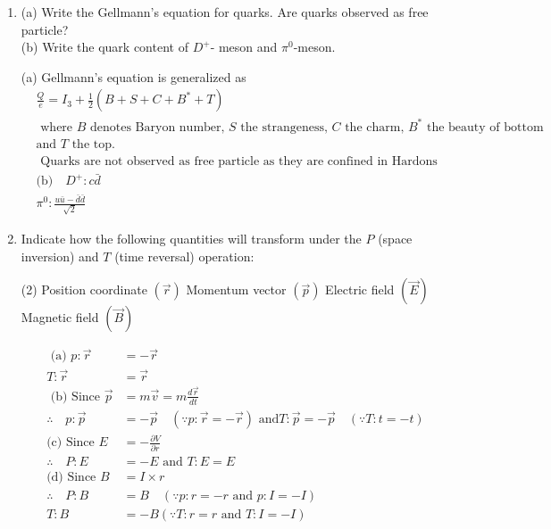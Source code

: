 \begin{enumerate}
\begin{tasks}
		\task[\textbf{d.}] $\Lambda \rightarrow \pi^{+}+e^{-}+\bar{v}_e$
	\end{tasks}
	\begin{answer}
(a) Forbidden because Lepton number is not conserved\\
	(b) Forbidden because charge is not conserved\\
	(c) Allowed\\
	(d) Allowed
\end{answer}
	\item (a) Write the Gellmann's equation for quarks. Are quarks observed as free particle?\\
	(b) Write the quark content of $D^{+}$- meson and $\pi^0$-meson.
		\begin{answer}
				(a) Gellmann's equation is generalized as
		\begin{align*}
		&\frac{Q}{e}=I_3+\frac{1}{2}\left(B+S+C+B^*+T\right)\\
	&\text{	where $B$ denotes Baryon number, $S$ the strangeness, $C$ the charm, $B^*$ the beauty of bottom }\\
	&\text{and $T$ the top.}\\
	&\text{	Quarks are not observed as free particle as they are confined in Hardons}\\
	&\text{(b)}\quad  D^{+}: c \bar{d}\\
	&\pi^0: \frac{u \bar{u}-\bar{d} \bar{d}}{\sqrt{2}}
		\end{align*}
	\end{answer}
	\item Indicate how the following quantities will transform under the $P$ (space inversion) and $T$ (time reversal) operation:
	 \begin{tasks}(2)
		\task[\textbf{a.}] Position coordinate $(\vec{r})$
		\task[\textbf{b.}] Momentum vector $(\vec{p})$
		\task[\textbf{c.}] Electric field $(\vec{E})$
		\task[\textbf{d.}] Magnetic field $(\vec{B})$
	\end{tasks}
		\begin{answer}
		\begin{align*}
		\text { (a) } p: \vec{r}&=-\vec{r}\\
		T: \vec{r}&=\vec{r}\\
	\text{	(b) Since }\vec{p}&=m \vec{v}=m \frac{d \vec{r}}{d t}\\
		\therefore \quad  p: \vec{p}&=-\vec{p} \quad(\because p: \vec{r}=-\vec{r})\text{ and} T: \vec{p}=-\vec{p} \quad(\because T: t=-t)\\
		\text{(c) Since }E&=-\frac{\partial V}{\partial r}\\
		\therefore \quad P: E&=-E \text{ and }T: E=E\\
		\text{(d) Since }B&=I \times r\\
		\therefore\quad  P: B&=B \quad(\because p: r=-r\text{ and }p: I=-I)\\
		T: B&=-B(\because T: r=r\text{ and }T: I=-I)
		\end{align*}
	\end{answer}
	


\end{enumerate}
